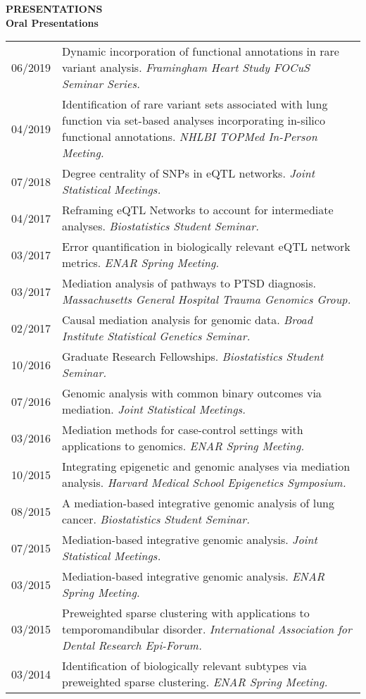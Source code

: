 \documentclass[10pt]{article}
\begin{document}
{ \bf PRESENTATIONS} \hrulefill \\


\textbf{Oral Presentations }  \setlength\intextsep{0mm}
\begin{center}
	\begin{table}[H]
		\centering
		\begin{tabular}{@{}p{2cm}@{}@{}p{14.9cm}@{}}
			06/2019  &  Dynamic incorporation of functional annotations in rare variant analysis. \textit{Framingham Heart Study FOCuS Seminar Series. }          \\ 
			04/2019  &  Identification of rare variant sets associated with lung function via set-based analyses incorporating in-silico functional annotations. \textit{NHLBI TOPMed In-Person Meeting. }          \\ 
			07/2018  & Degree centrality of SNPs in eQTL networks. \textit{Joint Statistical Meetings. }              \\ 
			04/2017  & Reframing eQTL Networks to account for intermediate analyses. \textit{Biostatistics Student Seminar. }\\
			03/2017  & Error quantification in biologically relevant eQTL network metrics. \textit{ENAR Spring Meeting.} \\
			03/2017  & Mediation analysis of pathways to PTSD diagnosis. \textit{Massachusetts General Hospital Trauma Genomics Group.} \\
			02/2017  & Causal mediation analysis for genomic data. \textit{Broad Institute Statistical Genetics Seminar.}  \\
			10/2016  & Graduate Research Fellowships. \textit{Biostatistics Student Seminar.} \\
			07/2016  & Genomic analysis with common binary outcomes via mediation. \textit{Joint Statistical Meetings.}\\
			03/2016  & Mediation methods for case-control settings with applications to genomics.\textit{ ENAR Spring Meeting.} \\
			10/2015  & Integrating epigenetic and genomic analyses via mediation analysis. \textit{Harvard Medical School Epigenetics Symposium. }\\
			08/2015  & A mediation-based integrative genomic analysis of lung cancer. \textit{Biostatistics Student Seminar. }\\
			07/2015  & Mediation-based integrative genomic analysis. \textit{Joint Statistical Meetings.} \\
			03/2015  & Mediation-based integrative genomic analysis. \textit{ENAR Spring Meeting.}\\
			03/2015  & Preweighted sparse clustering with applications to temporomandibular disorder. \textit{International Association for Dental Research Epi-Forum.} \\
			03/2014  & Identification of biologically relevant subtypes via preweighted sparse clustering. \textit{ENAR Spring Meeting.}
		\end{tabular}
	\end{table}
\end{center}
\end{document}
